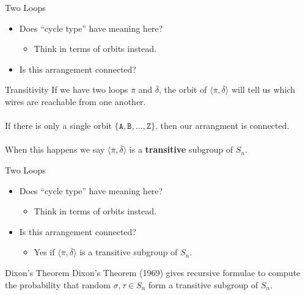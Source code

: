 \documentclass[hyphens,aspectratio=169]{beamer}
\begin{document}
\begin{frame}{Two Loops}
	\begin{itemize}
		\item Does ``cycle type'' have meaning here?
		      \pause
		      \begin{itemize}
			      \item Think in terms of orbits instead.
		      \end{itemize}
		      \pause
		      \vspace{1em}
		\item Is this arrangement connected?
	\end{itemize}
\end{frame}

\begin{frame}{Transitivity}
	If we have two loops $\overline\pi$ and $\overline\delta$, the orbit of $\langle\overline\pi, \overline\delta\rangle$ will tell us which wires are reachable from one another.
	\pause
	\\\\If there is only a single orbit $\{\texttt{A}, \texttt{B},\dots, \texttt{Z}\}$, then our arrangment is connected.
	\pause
	\\\\When this happens we say $\langle\overline\pi, \overline\delta \rangle$ is a \textbf{transitive} subgroup of $S_n$.
\end{frame}

\begin{frame}{Two Loops}
	\begin{itemize}
		\item Does ``cycle type'' have meaning here?
		      \begin{itemize}
			      \item Think in terms of orbits instead.
		      \end{itemize}
		      \vspace{1em}
		\item Is this arrangement connected?
		      \pause
		      \begin{itemize}
			      \item Yes if $\langle\overline\pi, \overline\delta\rangle$ is a transitive subgroup of $S_n$.
		      \end{itemize}
	\end{itemize}
\end{frame}


\begin{frame}[fragile]{Dixon's Theorem}
	\large
	Dixon's Theorem (1969) gives recursive formulae to compute the probability that random $\sigma, \tau\in S_n$ form a transitive subgroup of $S_n$.
\end{frame}
\end{document}

